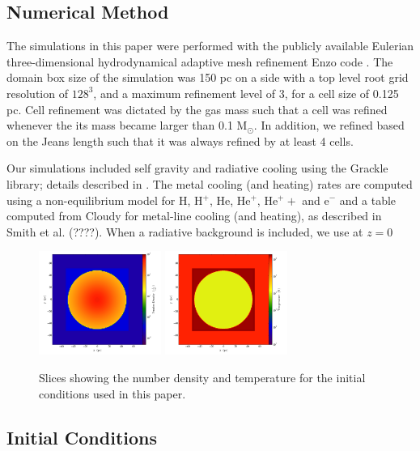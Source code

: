 \documentclass[useAMS,usenatbib]{mn2e}
\begin{document}
\subsection{Numerical Method}

The simulations in this paper were performed with the publicly available Eulerian three-dimensional
hydrodynamical adaptive mesh refinement Enzo code \citep{Bryan2013}. The domain
box size of the simulation was 150 pc on a side with a top level root grid resolution of $128^3$, and
a maximum refinement level of 3, for a cell size of 0.125 pc.  Cell refinement was dictated 
by the gas mass such that a cell was refined whenever the its mass became larger than 0.1 M$_\odot$.
In addition, we refined based on the Jeans length such that it was
always refined by at least 4 cells.

Our simulations included self gravity and radiative cooling using the
Grackle library; details described in \cite{Bryan2013}. The metal cooling (and
heating) rates are computed using a non-equilibrium model for H, H$^+$, He, He$^+$, He$^++$ and e$^-$
and a table computed from Cloudy for metal-line cooling (and heating), as described in Smith et al. (????).
When a radiative background is included, we use \cite{Haardt2012} at $z=$0

\begin{figure}
\begin{center}
\includegraphics[width=4cm]{Images/Initial_number_density}
\includegraphics[width=4cm]{Images/Initial_temperature}
\end{center}
\caption{\label{fig:initial_setup} Slices showing the number density and temperature 
for the initial conditions used in this paper. }
\end{figure}

\subsection{Initial Conditions}
\end{document}
